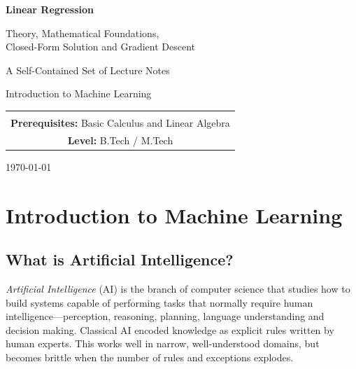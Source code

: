 \documentclass[11pt,a4paper]{report}
\theoremstyle{definition}
\theoremstyle{plain}
\theoremstyle{remark}
\begin{document}
	
	\begin{titlepage}
		\centering
		\vspace*{2cm}
		{\Huge\bfseries Linear Regression\par}
		\vspace{0.6cm}
		{\Large Theory, Mathematical Foundations,\\[2pt]
			Closed-Form Solution and Gradient Descent\par}
		\vspace{1.5cm}
		{\large A Self-Contained Set of Lecture Notes\par}
		\vspace{0.4cm}
		{\large Introduction to Machine Learning\par}
		\vspace{2.5cm}
		\begin{tabular}{c}
			\hline\\[-6pt]
			\textbf{Prerequisites:} Basic Calculus and Linear Algebra\\[4pt]
			\textbf{Level:} B.Tech / M.Tech\\[4pt]
			\hline
		\end{tabular}
		\vfill
		{\large \today\par}
	\end{titlepage}
	
	\tableofcontents
	\clearpage
	
	\chapter{Introduction to Machine Learning}
	
	\section{What is Artificial Intelligence?}
	\emph{Artificial Intelligence} (AI) is the branch of computer science that
	studies how to build systems capable of performing tasks that normally require
	human intelligence---perception, reasoning, planning, language understanding
	and decision making. Classical AI encoded knowledge as explicit rules written
	by human experts. This works well in narrow, well-understood domains, but
	becomes brittle when the number of rules and exceptions explodes.
	
\end{document}
